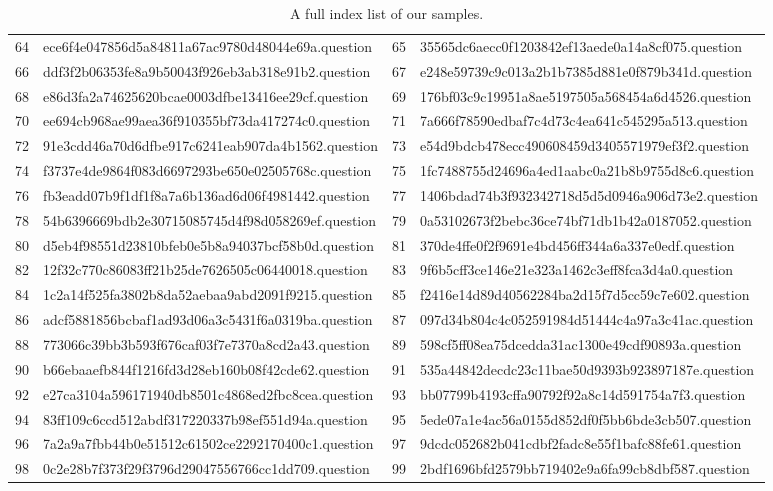 \begin{table*}[!ht]
{\begin{tabular}{@{}l@{\quad}l|l@{\quad}l@{}}
64 & ece6f4e047856d5a84811a67ac9780d48044e69a.question &  65 & 35565dc6aecc0f1203842ef13aede0a14a8cf075.question \\
66 & ddf3f2b06353fe8a9b50043f926eb3ab318e91b2.question &  67 & e248e59739c9c013a2b1b7385d881e0f879b341d.question \\
68 & e86d3fa2a74625620bcae0003dfbe13416ee29cf.question &  69 & 176bf03c9c19951a8ae5197505a568454a6d4526.question \\
70 & ee694cb968ae99aea36f910355bf73da417274c0.question &  71 & 7a666f78590edbaf7c4d73c4ea641c545295a513.question \\
72 & 91e3cdd46a70d6dfbe917c6241eab907da4b1562.question &  73 & e54d9bdcb478ecc490608459d3405571979ef3f2.question \\
74 & f3737e4de9864f083d6697293be650e02505768c.question &  75 & 1fc7488755d24696a4ed1aabc0a21b8b9755d8c6.question \\
76 & fb3eadd07b9f1df1f8a7a6b136ad6d06f4981442.question &  77 & 1406bdad74b3f932342718d5d5d0946a906d73e2.question \\
78 & 54b6396669bdb2e30715085745d4f98d058269ef.question &  79 & 0a53102673f2bebc36ce74bf71db1b42a0187052.question \\
80 & d5eb4f98551d23810bfeb0e5b8a94037bcf58b0d.question &  81 & 370de4ffe0f2f9691e4bd456ff344a6a337e0edf.question \\
82 & 12f32c770c86083ff21b25de7626505c06440018.question &  83 & 9f6b5cff3ce146e21e323a1462c3eff8fca3d4a0.question \\
84 & 1c2a14f525fa3802b8da52aebaa9abd2091f9215.question &  85 & f2416e14d89d40562284ba2d15f7d5cc59c7e602.question \\
86 & adcf5881856bcbaf1ad93d06a3c5431f6a0319ba.question &  87 & 097d34b804c4c052591984d51444c4a97a3c41ac.question \\
88 & 773066c39bb3b593f676caf03f7e7370a8cd2a43.question &  89 & 598cf5ff08ea75dcedda31ac1300e49cdf90893a.question \\
90 & b66ebaaefb844f1216fd3d28eb160b08f42cde62.question &  91 & 535a44842decdc23c11bae50d9393b923897187e.question \\
92 & e27ca3104a596171940db8501c4868ed2fbc8cea.question &  93 & bb07799b4193cffa90792f92a8c14d591754a7f3.question \\
94 & 83ff109c6ccd512abdf317220337b98ef551d94a.question &  95 & 5ede07a1e4ac56a0155d852df0f5bb6bde3cb507.question \\
96 & 7a2a9a7fbb44b0e51512c61502ce2292170400c1.question &  97 & 9dcdc052682b041cdbf2fadc8e55f1bafc88fe61.question \\
98 & 0c2e28b7f373f29f3796d29047556766cc1dd709.question &  99 & 2bdf1696bfd2579bb719402e9a6fa99cb8dbf587.question \\
	\bottomrule
	\end{tabular}
	} %
	\caption{A full index list of our samples.}
	\label{table:index}
\end{table*}

